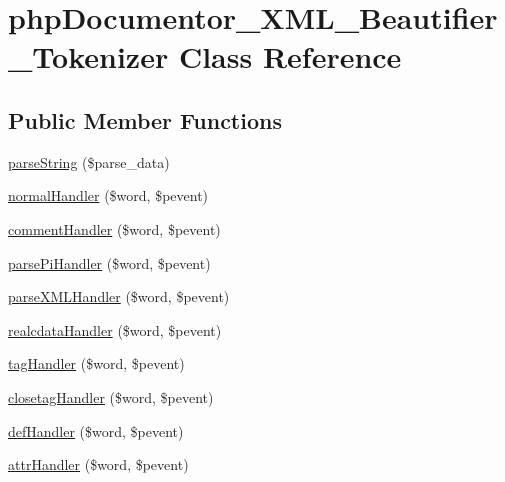 \hypertarget{classphp_documentor___x_m_l___beautifier___tokenizer}{\section{php\-Documentor\-\_\-\-X\-M\-L\-\_\-\-Beautifier\-\_\-\-Tokenizer \-Class \-Reference}
\label{classphp_documentor___x_m_l___beautifier___tokenizer}
}
\subsection*{\-Public \-Member \-Functions}
\begin{DoxyCompactItemize}
\item 
\hyperlink{classphp_documentor___x_m_l___beautifier___tokenizer_a685d75d5c506dac557f2d500673b3275}{parse\-String} (\$parse\-\_\-data)
\item 
\hyperlink{classphp_documentor___x_m_l___beautifier___tokenizer_ae60ec962553bd725a37a2011a0b7583d}{normal\-Handler} (\$word, \$pevent)
\item 
\hyperlink{classphp_documentor___x_m_l___beautifier___tokenizer_ab5c2fca9a6e7dfee650fb6c96cd1a4e4}{comment\-Handler} (\$word, \$pevent)
\item 
\hyperlink{classphp_documentor___x_m_l___beautifier___tokenizer_ab9d9fe389010c144aa58c4913c51580f}{parse\-Pi\-Handler} (\$word, \$pevent)
\item 
\hyperlink{classphp_documentor___x_m_l___beautifier___tokenizer_a4b3b781995248ef67537bffcd2d46dd7}{parse\-X\-M\-L\-Handler} (\$word, \$pevent)
\item 
\hyperlink{classphp_documentor___x_m_l___beautifier___tokenizer_a1dfa9e97faa33a95fdd27a59669d269b}{realcdata\-Handler} (\$word, \$pevent)
\item 
\hyperlink{classphp_documentor___x_m_l___beautifier___tokenizer_a6c5ea26895bf27dd9be667dbe9b53614}{tag\-Handler} (\$word, \$pevent)
\item 
\hyperlink{classphp_documentor___x_m_l___beautifier___tokenizer_ac11d7ab2ea73797e18a0a9c5073c085a}{closetag\-Handler} (\$word, \$pevent)
\item 
\hyperlink{classphp_documentor___x_m_l___beautifier___tokenizer_a8082b25515c71891e9cbd00a29b02ebc}{def\-Handler} (\$word, \$pevent)
\item 
\hyperlink{classphp_documentor___x_m_l___beautifier___tokenizer_aca93ae59baadad268faadf6bb922a7f6}{attr\-Handler} (\$word, \$pevent)

\end{DoxyCompactItemize}
